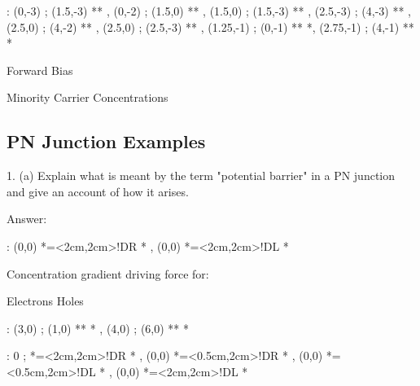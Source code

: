 \documentclass[a4paper,12pt]{article}
\begin{document}
\begin{table}[hbtp]

\xy <1cm,0cm>:
(0,-3) ; (1.5,-3) **\dir{-} ,
(0,-2) ; (1.5,0) ** , %
(1.5,0) ; (1.5,-3) **\dir{-} ,
%
(2.5,-3) ; (4,-3) **\dir{-} ,
(2.5,0) ; (4,-2) ** , %
(2.5,0) ; (2.5,-3) **\dir{-} ,
%
(1.25,-1) ; (0,-1) **\dir{-} *\dir{>},
(2.75,-1) ; (4,-1) **\dir{-} *\dir{>}
\endxy

\caption{Forward Bias}

\end{table}

\begin{table}[hbtp]

Minority Carrier Concentrations

\end{table}


\subsection{PN Junction Examples}

1. (a) Explain what is meant by the term "potential barrier" in a PN
junction and give an account of how it arises.

Answer:

\begin{table}[hbtp]

\xy <1cm,0cm>:
(0,0) *=<2cm,2cm>!DR *\frm{-} ,
(0,0) *=<2cm,2cm>!DL *\frm{-} 
\endxy

\end{table}

Concentration gradient driving force for:

Electrons Holes

\begin{table}[hbtp]

\xy <1cm,0cm>:
(3,0) ; (1,0) **\dir{-} *\dir{>} ,
(4,0) ; (6,0) **\dir{-} *\dir{>}
\endxy

\end{table}

\begin{table}[hbtp]

\xy <1cm,0cm>:
0 ; *=<2cm,2cm>!DR *\frm{-} ,
(0,0) *=<0.5cm,2cm>!DR\txt{-} *\frm{-} ,
(0,0) *=<0.5cm,2cm>!DL\txt{+} *\frm{-} ,
(0,0) *=<2cm,2cm>!DL *\frm{-} 
\endxy

\end{table}
\end{document}
